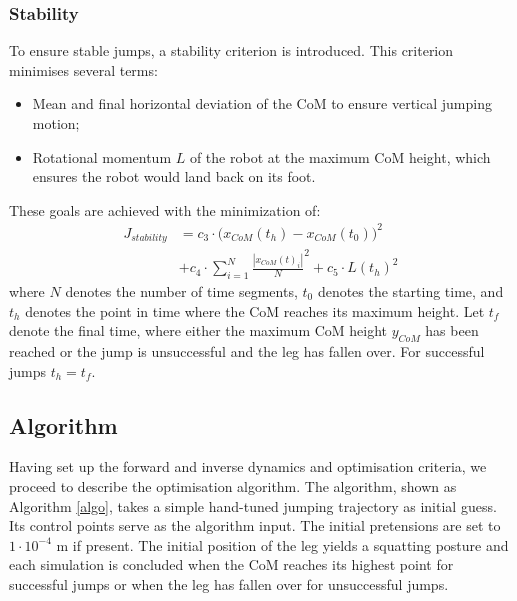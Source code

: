 \documentclass[letterpaper, 10 pt, conference]{ieeeconf}  %
\begin{document}
\subsubsection{Stability}
To ensure stable jumps, a stability criterion is introduced. This criterion minimises several terms:
\begin{itemize}
	\item Mean and final horizontal deviation of the CoM to ensure vertical jumping motion;
	\item Rotational momentum $L$ of the robot at the maximum CoM height, which ensures the robot would land back on its foot.
\end{itemize}
These goals are achieved with the minimization of:
\begin{equation}
	\begin{aligned}
		J_{stability} & =  c_3\cdot \Big( x_{CoM}(t_h)-x_{CoM}(t_0) \Big)^2  \\ & +c_4\cdot  {\sum^{N}_{i=1}\frac{| x_{CoM}(t)_i |}{N}}^2   
				  			+ c_5  \cdot   L(t_h)^2 
	\end{aligned}
\end{equation}
where $N$ denotes the number of time segments, $t_0$ denotes the starting time, and $t_h$ denotes the point in time where the CoM reaches its maximum height. Let $t_f$ denote the final time, where either the maximum CoM height $y_{CoM}$ has been reached or the jump is unsuccessful and the leg has fallen over. For successful jumps $t_h=t_f$.

\subsection{Algorithm}
\label{subsec:algorithm}
Having set up the forward and inverse dynamics and optimisation criteria, we proceed to describe the optimisation algorithm. The algorithm, shown as Algorithm \ref{algo}, takes a simple hand-tuned jumping trajectory as initial guess. Its control points serve as the algorithm input. The initial pretensions are set to $1 \cdot 10^{-4}$ m if present. 
The initial position of the leg yields a squatting posture and each simulation is concluded when the CoM reaches its highest point for successful jumps or when the leg has fallen over for unsuccessful jumps. 
\end{document}
